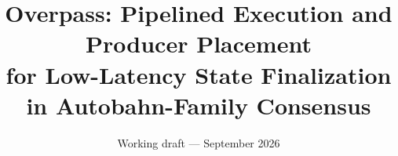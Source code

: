 \documentclass[letterpaper,twocolumn,10pt]{article}
\title{Overpass: Pipelined Execution and Producer Placement\\for Low-Latency State Finalization\\in Autobahn-Family Consensus}
\author{Working draft --- September 2026}
\date{}
\begin{document}
\maketitle
\thispagestyle{plain}
\draftnotice










\label{page:technical-end}
\clearpage

\begingroup\raggedright

\endgroup
\end{document}
